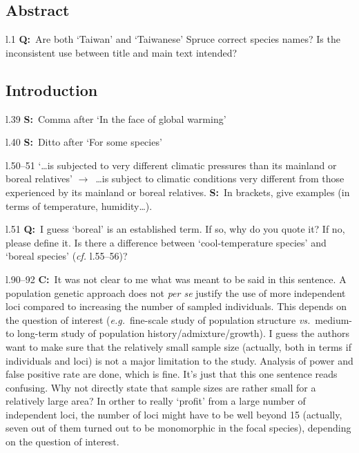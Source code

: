 \documentclass[11pt]{article}
\newenvironment{my_description}
{\begin{description}
  \setlength{\itemsep}{2pt}
  \setlength{\parskip}{0pt}
  \setlength{\parsep}{0pt}}
{\end{description}}
\newcommand{\ra}{$\rightarrow$\ }
\newcommand{\C}{\textbf{C:}\ }
\newcommand{\Q}{\textbf{Q:}\ }
\newcommand{\V}{\textbf{S:}\ }
\begin{document}
\subsection{Abstract}

\begin{my_description}
	\item[l.1] \Q Are both `Taiwan' and `Taiwanese' Spruce correct species names? Is the inconsistent use between title and main text intended? 
\end{my_description}

\subsection{Introduction}

\begin{my_description}
	\item[l.39] \V Comma after `In the face of global warming'
	\item[l.40] \V Ditto after `For some species'
	\item[l.50--51] `\dots is subjected to very different climatic pressures than its mainland or boreal relatives' \ra \dots is subject to climatic conditions very different from those experienced by its mainland or boreal relatives. \V In brackets, give examples (in terms of temperature, humidity\dots).
	\item[l.51] \Q I guess `boreal' is an established term. If so, why do you quote it? If no, please define it. Is there a difference between `cool-temperature species' and `boreal species' (\emph{cf.} l.55--56)?
	\item[l.90--92] \C It was not clear to me what was meant to be said in this sentence. A population genetic approach does not \emph{per se} justify the use of more independent loci compared to increasing the number of sampled individuals. This depends on the question of interest (\emph{e.g.}\ fine-scale study of population structure \emph{vs.}\ medium- to long-term study of population history/admixture/growth). I guess the authors want to make sure that the relatively small sample size (actually, both in terms if individuals and loci) is not a major limitation to the study. Analysis of power and false positive rate are done, which is fine. It's just that this one sentence reads confusing. Why not directly state that sample sizes are rather small for a relatively large area? In orther to really `profit' from a large number of independent loci, the number of loci might have to be well beyond 15 (actually, seven out of them turned out to be monomorphic in the focal species), depending on the question of interest.

\end{my_description}
\end{document}
